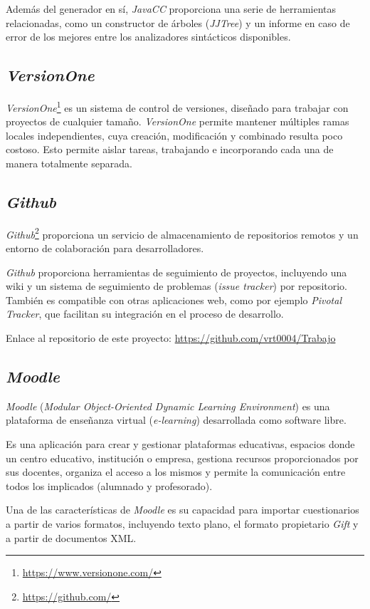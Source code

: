 Además del generador en sí, \textit{JavaCC} proporciona una serie de herramientas relacionadas, como un constructor de árboles (\textit{JJTree}) y un informe en caso de error de los mejores entre los analizadores sintácticos disponibles.

\subsection{\textit{VersionOne}}
\textit{VersionOne}\footnote{\url{https://www.versionone.com/}} es un sistema de control de versiones, diseñado para trabajar con proyectos de cualquier tamaño.
\textit{VersionOne} permite mantener múltiples ramas locales independientes, cuya creación, modificación y combinado resulta poco costoso.
Esto permite aislar tareas, trabajando e incorporando cada una de manera totalmente separada.

\subsection{\textit{Github}}
\textit{Github}\footnote{\url{https://github.com/}} proporciona un servicio de almacenamiento de repositorios remotos y un entorno de colaboración para desarrolladores.

\textit{Github} proporciona herramientas de seguimiento de proyectos, incluyendo una wiki y un sistema de seguimiento de problemas (\emph{issue tracker}) por repositorio.
También es compatible con otras aplicaciones web, como por ejemplo \textit{Pivotal Tracker}, que facilitan su integración en el proceso de desarrollo.

Enlace al repositorio de este proyecto:  \url{https://github.com/vrt0004/Trabajo}

\subsection{\textit{Moodle}}
\textit{Moodle} (\emph{Modular Object-Oriented Dynamic Learning Environment}) es una plataforma de enseñanza virtual (\emph{e-learning}) desarrollada como software libre.

Es una aplicación para crear y gestionar plataformas educativas, espacios donde un centro educativo, institución o empresa, gestiona recursos proporcionados por sus docentes, organiza el acceso a los mismos y permite la comunicación entre todos los implicados (alumnado y profesorado).

Una de las características de \textit{Moodle} es su capacidad para importar cuestionarios a partir de varios formatos, incluyendo texto plano, el formato propietario \textit{Gift} y a partir de documentos XML.

